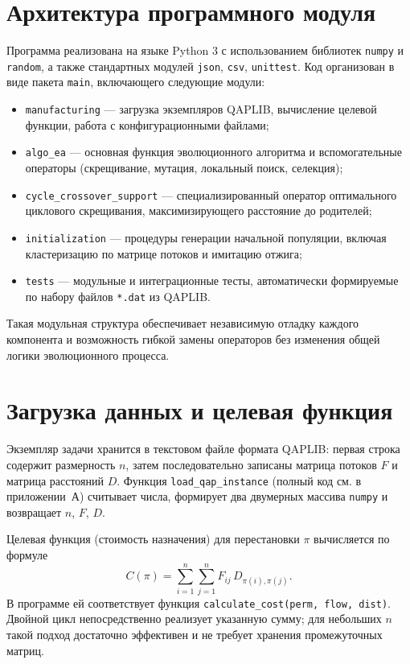 \documentclass[732]{studrep}
\theoremstyle{nonumberplain}
\begin{document}
\section{Архитектура программного модуля}
\label{sec:architecture}

Программа реализована на языке Python 3 с использованием библиотек \texttt{numpy} и \texttt{random}, а также стандартных модулей \texttt{json}, \texttt{csv}, \texttt{unittest}. Код организован в виде пакета \texttt{main}, включающего следующие модули:

\begin{itemize}
\item \texttt{manufacturing} — загрузка экземпляров QAPLIB, вычисление целевой функции, работа с конфигурационными файлами;
\item \texttt{algo\_ea} — основная функция эволюционного алгоритма и вспомогательные операторы (скрещивание, мутация, локальный поиск, селекция);
\item \texttt{cycle\_crossover\_support} — специализированный оператор оптимального циклового скрещивания, максимизирующего расстояние до родителей;
\item \texttt{initialization} — процедуры генерации начальной популяции, включая кластеризацию по матрице потоков и имитацию отжига;
\item \texttt{tests} — модульные и интеграционные тесты, автоматически формируемые по набору файлов \texttt{*.dat} из QAPLIB.
\end{itemize}

Такая модульная структура обеспечивает независимую отладку каждого компонента и возможность гибкой замены операторов без изменения общей логики эволюционного процесса.

\section{Загрузка данных и целевая функция}
\label{sec:data}

Экземпляр задачи хранится в текстовом файле формата QAPLIB: первая строка содержит размерность $n$, затем последовательно записаны матрица потоков $F$ и матрица расстояний $D$. Функция \texttt{load\_qap\_instance} (полный код см. в приложении~А) считывает числа, формирует два двумерных массива \texttt{numpy} и возвращает $n$, $F$, $D$.

Целевая функция (стоимость назначения) для перестановки $\pi$ вычисляется по формуле
\[
C(\pi) = \sum_{i=1}^{n}\sum_{j=1}^{n} F_{ij}\, D_{\pi(i),\pi(j)}.
\]
В программе ей соответствует функция \texttt{calculate\_cost(perm, flow, dist)}. Двойной цикл непосредственно реализует указанную сумму; для небольших $n$ такой подход достаточно эффективен и не требует хранения промежуточных матриц.
\end{document}

